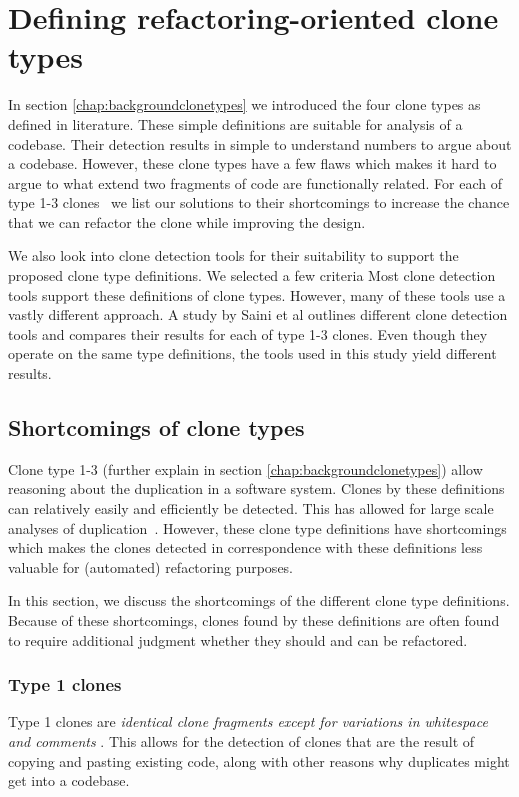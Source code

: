 \chapter{Defining refactoring-oriented clone types}\label{chap:clonetypes}
In section \ref{chap:backgroundclonetypes} we introduced the four clone types as defined in literature. These simple definitions are suitable for analysis of a codebase. Their detection results in simple to understand numbers to argue about a codebase. However, these clone types have a few flaws which makes it hard to argue to what extend two fragments of code are functionally related. For each of type 1-3 clones~\cite{roy2007survey} we list our solutions to their shortcomings to increase the chance that we can refactor the clone while improving the design.

We also look into clone detection tools for their suitability to support the proposed clone type definitions. We selected a few criteria  Most clone detection tools support these definitions of clone types. However, many of these tools use a vastly different approach. A study by Saini et al \cite{saini2018towards} outlines different clone detection tools and compares their results for each of type 1-3 clones. Even though they operate on the same type definitions, the tools used in this study yield different results.

\section{Shortcomings of clone types}
Clone type 1-3 (further explain in section \ref{chap:backgroundclonetypes}) allow reasoning about the duplication in a software system. Clones by these definitions can relatively easily and efficiently be detected. This has allowed for large scale analyses of duplication~\cite{livieri2007very}. However, these clone type definitions have shortcomings which makes the clones detected in correspondence with these definitions less valuable for (automated) refactoring purposes.

In this section, we discuss the shortcomings of the different clone type definitions. Because of these shortcomings, clones found by these definitions are often found to require additional judgment whether they should and can be refactored.

\subsection{Type 1 clones}\label{sec:type1}
Type 1 clones are \textit{identical clone fragments except for variations in whitespace and comments} \cite{roy2007survey}. This allows for the detection of clones that are the result of copying and pasting existing code, along with other reasons why duplicates might get into a codebase.

